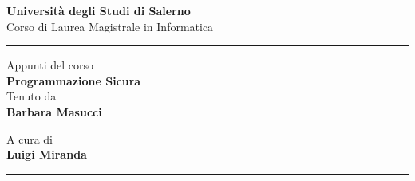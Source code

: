 \begin{titlepage} %
\begin{Large}
 \begin{center}
 \huge{ \bf Università degli Studi di Salerno\\ }
    \vspace{1mm}
	\large{{Corso di Laurea Magistrale in Informatica\\}}
    \vspace{2mm}
    \hrule %

    \vfill
    {{Appunti del corso}}\\
	\vspace{2mm}
	{\huge{\bf Programmazione Sicura}}\\
    \vspace{2mm}
     \small{Tenuto da \\ \bf Barbara Masucci}
 \vspace{2mm}
     \small{}
\end{center}
\end{Large}

\vfill
\begin{flushright}
   A cura di\\
    \bf Luigi Miranda
\end{flushright}

\hrule
\vspace{2mm}
\end{titlepage}